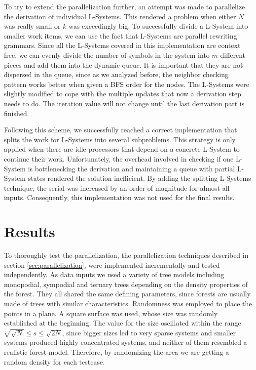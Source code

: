 \documentclass[letterpaper,twoside,11pt]{article}
\begin{document}
\begin{multicols}{2}
To try to extend the parallelization further, an attempt was made to parallelize the derivation of individual L-Systems. This rendered a problem when either $N$ was really small or $k$ was exceedingly big. To successfully divide a L-System into smaller work items, we can use the fact that L-Systems are parallel rewriting grammars. Since all the L-Systems covered in this implementation are context free, we can evenly divide the number of symbols in the system into $m$ different pieces and add them into the dynamic queue. It is important that they are not dispersed in the queue, since as we analyzed before, the neighbor checking pattern works better when given a BFS order for the nodes. The L-Systems were slightly modified to cope with the multiple updates that now a derivation step needs to do. The iteration value will not change until the last derivation part is finished.

Following this scheme, %
we successfully reached a correct implementation that splits the work for L-Systems into several subproblems. This strategy is only applied when there are idle processors that depend on a concrete L-System to continue their work. Unfortunately, the overhead involved in checking if one L-System is bottlenecking the derivation and maintaining a queue with partial L-System states rendered the solution inefficient. By adding the splitting L-Systems technique,  the serial was increased by an order of magnitude for almost all inputs. Consequently, this implementation was not used for the final results.



\section{Results} %
\label{sec:results}

To thoroughly test the parallelization, the parallelization techniques described in section \ref{sec:parallelization}, were implemented incrementally and tested independently. As data inputs we used a variety of tree models including monopodial, sympodial and ternary trees depending on the density properties of the forest. They all shared the same defining parameters, since forests are usually made of trees with similar characteristics. Randomness was employed to place the points in a plane. A square surface was used, whose size was randomly established at the beginning. The value for the size oscillated within the range $\sqrt{\sqrt{N}} \leq s \leq \sqrt{2N}$, since bigger sizes led to very sparse systems and smaller systems produced highly concentrated systems,  and neither of them resembled a realistic forest model. Therefore, by randomizing the area we are getting a random density for each testcase.


\end{multicols}
\end{document}
